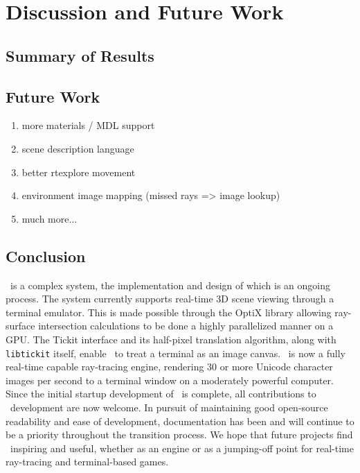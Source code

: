%
%
%

\chapter{Discussion and Future Work}\label{ch:conclusion}

\section{Summary of Results}\label{ch:conclusion:summary}

\section{Future Work}\label{ch:conclusion:future}

\begin{enumerate}
  \item more materials / MDL support
  \item scene description language
  \item better rtexplore movement
  \item environment image mapping (missed rays => image lookup)
  \item much more...
\end{enumerate}

\section{Conclusion}\label{ch:conclusion:end}

\name\ is a complex system, the implementation and design of which is an ongoing process.
The system currently supports real-time 3D scene viewing through a terminal emulator.
This is made possible through the OptiX library allowing ray-surface intersection calculations to be done a highly parallelized manner on a GPU.
The Tickit interface and its half-pixel translation algorithm, along with \texttt{libtickit} itself, enable \name\ to treat a terminal as an image canvas.
\name\ is now a fully real-time capable ray-tracing engine, rendering 30 or more Unicode character images per second to a terminal window on a moderately powerful computer.
Since the initial startup development of \name\ is complete, all contributions to \name\ development are now welcome.
In pursuit of maintaining good open-source readability and ease of development, documentation has been and will continue to be a priority throughout the transition process.
We hope that future projects find \name\ inspiring and useful, whether as an engine or as a jumping-off point for real-time ray-tracing and terminal-based games.
